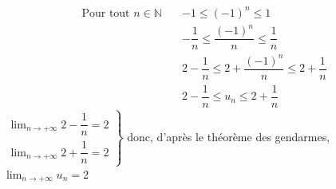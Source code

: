 \documentclass[french]{book}
\newcommand{\N}{\mathbb {N}}
\newcommand{\ie}{\leq}
\newcommand{\limn}{\lim_{n\rightarrow +\infty}}
\newcommand{\suite}[1][u]{\left( #1_{n} \right)_{n\in\N}}
\begin{document}
\begin{align*}
\text{Pour tout } n \in \N \quad
&-1 \ie (-1)^n \ie 1 \\
&-\dfrac{1}{n} \ie \dfrac{(-1)^{n}}{n} \ie \dfrac{1}{n}\\
&2-\dfrac{1}{n} \ie 2+\dfrac{(-1)^{n}}{n} \ie 2+\dfrac{1}{n}\\
&2-\dfrac{1}{n} \ie u_n \ie 2+\dfrac{1}{n}
\end{align*}
$\left.\begin{array}{l}
\limn 2-\dfrac{1}{n}=2\\
\limn 2+\dfrac{1}{n}=2
\end{array}\right\}$
donc, d'après le théorème des gendarmes, $\limn u_n=2$
%
%
% 
%
%
%
%
%
%
%
%
\end{document}
